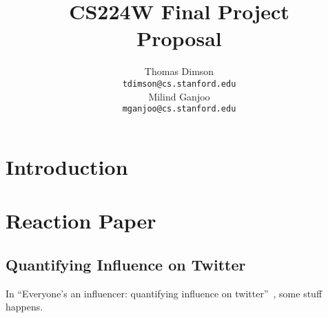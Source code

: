 \documentclass[11pt]{article}
\title{{\small CS224W Final Project} \\ Proposal}
\author{Thomas Dimson \\
  {\tt tdimson@cs.stanford.edu}
  \\\And
  Milind Ganjoo \\
  {\tt mganjoo@cs.stanford.edu}
}
\date{}
\newcommand{\titlecite}[2]{``#1''~\cite{#2}}
\begin{document}
\maketitle

\section{Introduction}

\section{Reaction Paper}
\subsection{Quantifying Influence on Twitter}
In \titlecite{Everyone's an influencer: quantifying influence on twitter}{bakshy2011everyone}, 
some stuff happens.

\end{document}
